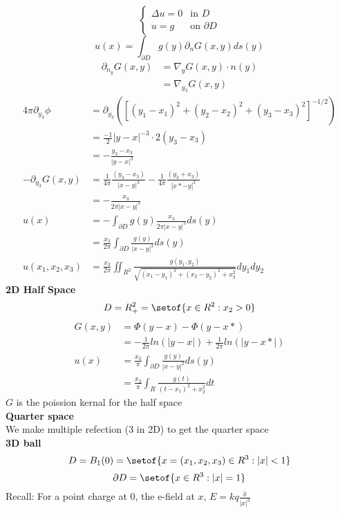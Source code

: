 \documentclass[answers,12pt,addpoints]{exam}
\begin{document}
$$\begin{cases}
    \Delta u = 0 & \text{in } D\\
    u = g & \text{on } \partial D
\end{cases}$$
$$u(x) = \int_{\partial D} g(y) \partial_n G(x,y) ds(y)$$
\begin{align*}
    \partial_{n_y} G(x,y) &= \nabla_y G(x,y) \cdot n(y)\\
    &= \nabla_{y_3} G(x,y)
\end{align*}
\begin{align*}
    4\pi \partial_{y_3} \phi &= \partial_{y_3}\left(\left[(y_1-x_1)^2 +  (y_2-x_2)^2 + (y_3-x_3)^2\right]^{-1/2}\right) \\
    &= \frac{-1}{2} |y-x|^{-3} \cdot 2 (y_3-x_3)\\
    &= -\frac{y_3 - x_3}{|y-x|^3}\\
    -\partial_{y_3} G(x,y) &= \frac{1}{4\pi} \frac{(y_3 - x_3)}{|x-y|^3} - \frac{1}{4\pi} \frac{(y_3 + x_3)}{|x*-y|^3}\\
    &= -\frac{x_3}{2\pi |x-y|^3}\\
    u(x) &= - \int_{\partial D} g(y) \frac{x_3}{2\pi |x-y|^3} ds(y)\\
    &= \frac{x_3}{2\pi} \int_{\partial D} \frac{g(y)}{|x-y|^3} ds(y)\\
    u(x_1,x_2,x_3) &= \frac{x_3}{2\pi} \iint_{R^2} \frac{g(y_1,y_2)}{\sqrt{(x_1-y_1)^2 + (x_2-y_2)^2 + x_3^2}} dy_1 dy_2
\end{align*}
\textbf{2D Half Space}\\
$$D = R^2_+ = \setof{x \in R^2: x_2 > 0}$$
\begin{align*}
    G(x,y) &= \Phi(y-x) - \Phi(y-x*)\\
    &= -\frac{1}{2\pi} ln(|y-x|) + \frac{1}{2\pi} ln(|y-x*|)\\
    u(x) &= \frac{x_2}{\pi} \int_{\partial D} \frac{g(y)}{|x-y|^2} ds(y)\\
    &= \frac{x_2}{\pi} \int_{R} \frac{g(t)}{(t-x_1)^2 + x_2^2} dt
\end{align*}
$G$ is the poission kernal for the half space\\
\textbf{Quarter space}\\
We make multiple refection (3 in 2D) to get the quarter space\\
\textbf{3D ball}\\
$$D = B_1(0) = \setof{x = (x_1,x_2,x_3) \in R^3: |x| < 1}$$
$$\partial D = \setof{x \in R^3: |x| = 1}$$
Recall: For a point charge at 0, the e-field at $x$, $E= kq \frac{\hat{x}}{|x|^3}$\\
\end{document}
